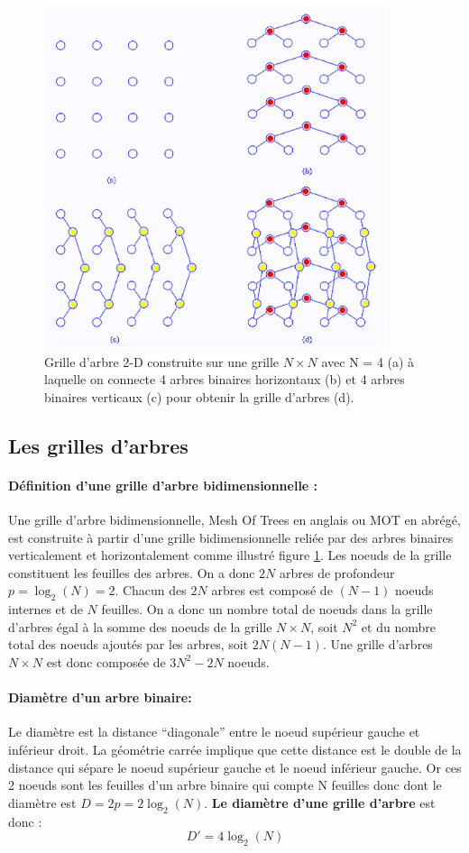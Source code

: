 \begin{figure}[htp]
  \centering
  \includegraphics[width=10cm]{images/gda}
  \caption{Grille d'arbre 2-D construite sur une grille $N \times N$ avec N = 4 (a) à laquelle on connecte 4 arbres binaires horizontaux (b) et 
  4 arbres binaires verticaux (c) pour obtenir la grille d'arbres (d).}
  \label{fig:gda}
\end{figure}
\subsection{Les grilles d'arbres}

\paragraph{Définition d'une grille d'arbre bidimensionnelle :}
Une grille d'arbre bidimensionnelle, Mesh Of Trees en anglais ou MOT en abrégé, est construite à partir d'une grille
bidimensionnelle reliée par des arbres binaires verticalement et horizontalement comme illustré figure \ref{fig:gda}.
Les noeuds de la grille constituent les feuilles des arbres. On a donc $2N$ arbres de profondeur $p = \log_2(N) = 2$.
Chacun des $2N$ arbres est composé de $(N-1)$ noeuds internes et de $N$ feuilles. On a donc un nombre total de noeuds dans la grille
d'arbres égal à la somme des noeuds de la grille $N \times N$, soit $N^2$ et du nombre total des noeuds ajoutés par les arbres, soit $2N(N-1)$. 
Une grille d'arbres $N\times N$ est donc composée de $3N^2 - 2N$ noeuds.



\paragraph{Diamètre d'un arbre binaire: } Le diamètre est la distance ``diagonale'' entre le noeud supérieur gauche et inférieur droit. La géométrie
carrée implique que cette distance est le double de la distance qui sépare le noeud supérieur gauche et le noeud inférieur gauche. Or ces 2
noeuds sont les feuilles d'un arbre binaire qui compte N feuilles donc dont le diamètre est $D = 2p = 2\log_2(N)$. \textbf{Le diamètre d'une grille d'arbre}
est donc : \[D' = 4\log_2(N)\] 

